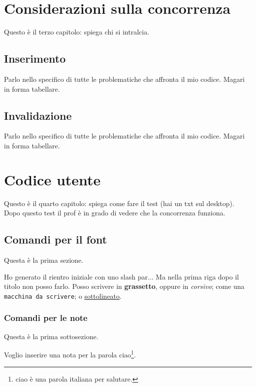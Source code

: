 \documentclass[a4paper,12pt,oneside]{book}
\begin{document}
	\chapter{Considerazioni sulla concorrenza}
	Questo è il terzo capitolo: spiega chi si intralcia.
	
	\section{Inserimento}
	Parlo nello specifico di tutte le problematiche che affronta il mio codice. Magari in forma tabellare.

	\section{Invalidazione}
	Parlo nello specifico di tutte le problematiche che affronta il mio codice. Magari in forma tabellare.



	\chapter{Codice utente}
	Questo è il quarto capitolo: spiega come fare il test (hai un txt sul desktop). Dopo questo test il prof è in grado di vedere che la concorrenza funziona.













	\section{Comandi per il font}
	Questa è la prima sezione. 
	\par Ho generato il rientro iniziale con uno slash par... Ma nella prima riga dopo il titolo non posso farlo. Posso scrivere in \textbf{grassetto}, oppure in \emph{corsivo}; come una \texttt{macchina da scrivere}; o \underline{sottolineato}.
	\subsection{Comandi per le note}
	Questa è la prima sottosezione.
	\par  Voglio inserire una nota per la parola ciao\footnote{ciao è una parola italiana per salutare.}.
\end{document}
